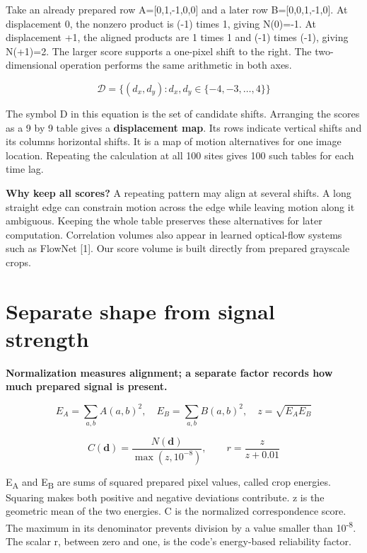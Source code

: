 \documentclass[11pt,letterpaper]{article}
\begin{document}
Take an already prepared row A=[0,1,-1,0,0] and a later row B=[0,0,1,-1,0]. At displacement 0, the nonzero product is (-1) times 1, giving N(0)=-1. At displacement +1, the aligned products are 1 times 1 and (-1) times (-1), giving N(+1)=2. The larger score supports a one-pixel shift to the right. The two-dimensional operation performs the same arithmetic in both axes.


\begin{equation}\mathcal D=\{(d_x,d_y):d_x,d_y\in\{-4,-3,\ldots,4\}\}\end{equation}

The symbol D in this equation is the set of candidate shifts. Arranging the scores as a 9 by 9 table gives a \textbf{displacement map}. Its rows indicate vertical shifts and its columns horizontal shifts. It is a map of motion alternatives for one image location. Repeating the calculation at all 100 sites gives 100 such tables for each time lag.


\textbf{Why keep all scores?} A repeating pattern may align at several shifts. A long straight edge can constrain motion across the edge while leaving motion along it ambiguous. Keeping the whole table preserves these alternatives for later computation. Correlation volumes also appear in learned optical-flow systems such as FlowNet [1]. Our score volume is built directly from prepared grayscale crops.


\clearpage

\section{Separate shape from signal strength}\label{sec5}

\textbf{Normalization measures alignment; a separate factor records how much prepared signal is present.}


\begin{equation}E_A=\sum_{a,b}A(a,b)^2,\quad E_B=\sum_{a,b}B(a,b)^2,\quad z=\sqrt{E_AE_B}\end{equation}

\begin{equation}C(\mathbf d)=\frac{N(\mathbf d)}{\max(z,10^{-8})},\qquad r=\frac{z}{z+0.01}\end{equation}

E\textsubscript{A} and E\textsubscript{B} are sums of squared prepared pixel values, called crop energies. Squaring makes both positive and negative deviations contribute. z is the geometric mean of the two energies. C is the normalized correspondence score. The maximum in its denominator prevents division by a value smaller than 10\textsuperscript{-8}. The scalar r, between zero and one, is the code's energy-based reliability factor.
\end{document}
